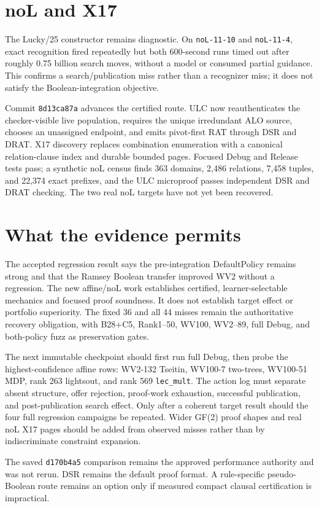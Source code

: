 \documentclass[11pt]{article}
\newcommand{\code}[1]{\texttt{#1}}
\begin{document}
\section*{noL and X17}

The Lucky/25 constructor remains diagnostic.  On \code{noL-11-10} and
\code{noL-11-4}, exact recognition fired repeatedly but both 600-second runs
timed out after roughly 0.75 billion search moves, without a model or consumed
partial guidance.  This confirms a search/publication miss rather than a
recognizer miss; it does not satisfy the Boolean-integration objective.

Commit \code{8d13ca87a} advances the certified route.  ULC now reauthenticates
the checker-visible live population, requires the unique irredundant ALO
source, chooses an unassigned endpoint, and emits pivot-first RAT through DSR
and DRAT.  X17 discovery replaces combination enumeration with a canonical
relation-clause index and durable bounded pages.  Focused Debug and Release
tests pass; a synthetic noL census finds 363 domains, 2,486 relations, 7,458
tuples, and 22,374 exact prefixes, and the ULC microproof passes independent
DSR and DRAT checking.  The two real noL targets have not yet been recovered.

\section*{What the evidence permits}

The accepted regression result says the pre-integration DefaultPolicy remains
strong and that the Ramsey Boolean transfer improved WV2 without a regression.
The new affine/noL work establishes certified, learner-selectable mechanics and
focused proof soundness.  It does not establish target effect or portfolio
superiority.  The fixed 36 and all 44 misses remain the authoritative recovery
obligation, with B28+C5, Rank1--50, WV100, WV2--89, full Debug, and both-policy
fuzz as preservation gates.

The next immutable checkpoint should first run full Debug, then probe the
highest-confidence affine rows: WV2-132 Tseitin, WV100-7 two-trees, WV100-51
MDP, rank 263 lightsout, and rank 569 \code{lec\_mult}.  The action log must
separate absent structure, offer rejection, proof-work exhaustion, successful
publication, and post-publication search effect.  Only after a coherent target
result should the four full regression campaigns be repeated.  Wider GF(2)
proof shapes and real noL X17 pages should be added from observed misses rather
than by indiscriminate constraint expansion.

The saved \code{d170b4a5} comparison remains the approved performance
authority and was not rerun.  DSR remains the default proof format.  A
rule-specific pseudo-Boolean route remains an option only if measured compact
clausal certification is impractical.
\end{document}

